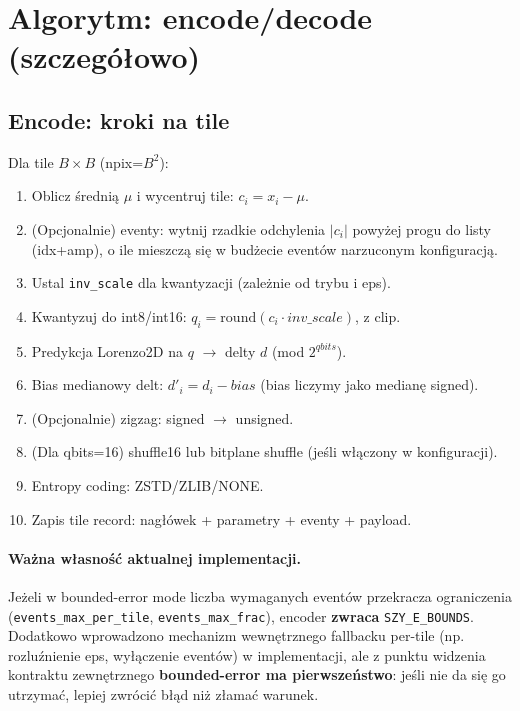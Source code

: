 \documentclass[11pt,a4paper]{article}
\begin{document}
\section{Algorytm: encode/decode (szczegółowo)}

\subsection{Encode: kroki na tile}
Dla tile $B\times B$ (npix=$B^2$):
\begin{enumerate}
  \item Oblicz średnią $\mu$ i wycentruj tile: $c_i = x_i - \mu$.
  \item (Opcjonalnie) eventy: wytnij rzadkie odchylenia $|c_i|$ powyżej progu do listy (idx+amp), o ile mieszczą się w budżecie eventów narzuconym konfiguracją.
  \item Ustal \texttt{inv\_scale} dla kwantyzacji (zależnie od trybu i eps).
  \item Kwantyzuj do int8/int16: $q_i = \mathrm{round}(c_i\cdot inv\_scale)$, z clip.
  \item Predykcja Lorenzo2D na $q$ $\rightarrow$ delty $d$ (mod $2^{qbits}$).
  \item Bias medianowy delt: $d'_i = d_i - bias$ (bias liczymy jako medianę signed).
  \item (Opcjonalnie) zigzag: signed $\rightarrow$ unsigned.
  \item (Dla qbits=16) shuffle16 lub bitplane shuffle (jeśli włączony w konfiguracji).
  \item Entropy coding: ZSTD/ZLIB/NONE.
  \item Zapis tile record: nagłówek + parametry + eventy + payload.
\end{enumerate}

\paragraph{Ważna własność aktualnej implementacji.}
Jeżeli w bounded-error mode liczba wymaganych eventów przekracza ograniczenia (\texttt{events\_max\_per\_tile}, \texttt{events\_max\_frac}), encoder \textbf{zwraca} \texttt{SZY\_E\_BOUNDS}. Dodatkowo wprowadzono mechanizm wewnętrznego fallbacku per-tile (np. rozluźnienie eps, wyłączenie eventów) w implementacji, ale z punktu widzenia kontraktu zewnętrznego \textbf{bounded-error ma pierwszeństwo}: jeśli nie da się go utrzymać, lepiej zwrócić błąd niż złamać warunek.
\end{document}
